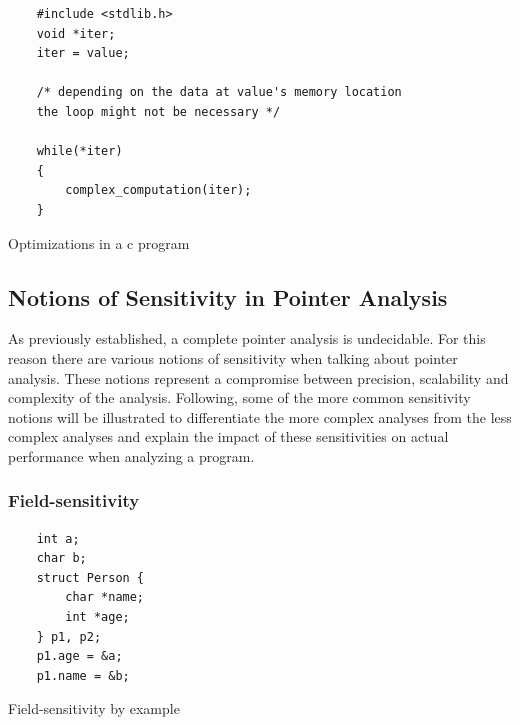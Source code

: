 \begin{listing}
    \begin{verbatim}
    #include <stdlib.h>
    void *iter;
    iter = value;

    /* depending on the data at value's memory location 
    the loop might not be necessary */
    
    while(*iter)
    {
        complex_computation(iter);
    }
    \end{verbatim}
    \caption{Optimizations in a c program}
    \label{lst:dataflow}
\end{listing}

\subsection{Notions of Sensitivity in Pointer Analysis}
As previously established, a complete pointer analysis is undecidable.
For this reason there are various notions of sensitivity when talking about pointer analysis.
These notions represent a compromise between precision, scalability and complexity of the analysis.
Following, some of the more common sensitivity notions will be illustrated to differentiate the more complex analyses from the less complex analyses and explain the impact of these sensitivities on actual performance when analyzing a program.

\subsubsection{Field-sensitivity}

\begin{listing}
    \begin{verbatim}
    int a;
    char b;
    struct Person {
        char *name;
        int *age;
    } p1, p2;
    p1.age = &a;
    p1.name = &b;
        \end{verbatim}
    \caption{Field-sensitivity by example}
    \label{lst:field}
\end{listing}

